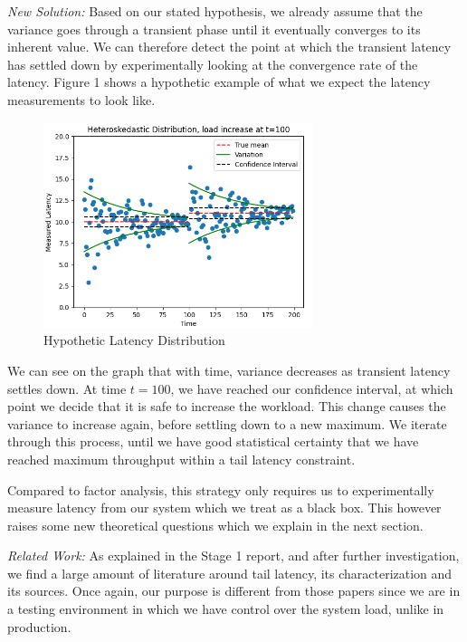 \documentclass[12pt]{article}
\begin{document}
\noindent \textit{New Solution:} Based on our stated hypothesis, we already assume that the variance goes through a transient phase until it eventually converges to its inherent value. We can therefore detect the point at which the transient latency has settled down by experimentally looking at the convergence rate of the latency. Figure 1 shows a hypothetic example of what we expect the latency measurements to look like.

\clearpage
\begin{figure}[H]
  \centering
  \includegraphics[width=0.7\textwidth]{distrib.png}
  \caption{Hypothetic Latency Distribution}
  \label{fig:sample}
\end{figure}

\noindent We can see on the graph that with time, variance decreases as transient latency settles down. At time $t=100$, we have reached our confidence interval, at which point we decide that it is safe to increase the workload. This change causes the variance to increase again, before settling down to a new maximum. We iterate through this process, until we have good statistical certainty that we have reached maximum throughput within a tail latency constraint. 

\noindent Compared to factor analysis, this strategy only requires us to experimentally measure latency from our system which we treat as a black box. This however raises some new theoretical questions which we explain in the next section.

\singlespacing

\noindent \textit{Related Work:} As explained in the Stage 1 report, and after further investigation, we find a large amount of literature around tail latency, its characterization and its sources. Once again, our purpose is different from those papers since we are in a testing environment in which we have control over the system load, unlike in production.
\end{document}
